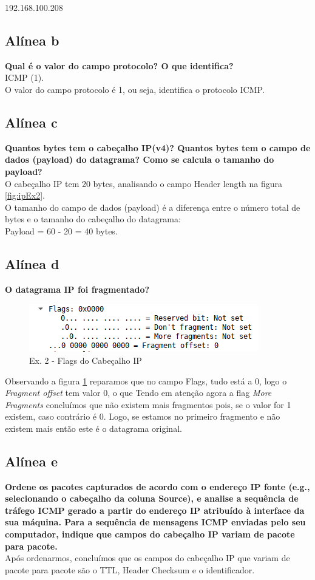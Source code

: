 \documentclass[a4paper]{report}
\begin{document}
192.168.100.208

\subsection{Alínea b}
\textbf{Qual é o valor do campo protocolo? O que identifica?}\\
ICMP (1).\\
O valor do campo protocolo é 1, ou seja, identifica o protocolo ICMP.

\subsection{Alínea c}
\textbf{Quantos bytes tem o cabeçalho IP(v4)? Quantos bytes tem o
campo de dados (payload) do datagrama? Como se calcula o tamanho 
do payload?}\\
O cabeçalho IP tem 20 bytes, analisando o campo Header length na 
figura \ref{fig:ipEx2}.\\
O tamanho do campo de dados (payload) é a diferença entre o número 
total de bytes e o tamanho do cabeçalho do datagrama:\\
Payload = 60 - 20 = 40 bytes.

\subsection{Alínea d}
\textbf{O datagrama IP foi fragmentado? }

\begin{figure}[H]
    \centering 
    \includegraphics[width=\textwidth]{images/ipEx2Flags.png}
    \caption{Ex. 2 - Flags do Cabeçalho IP}
    \label{fig:ipEx2Flags}
\end{figure}
Observando a figura \ref{fig:ipEx2Flags} reparamos que no 
campo Flags, tudo está a 0, logo o \textit{Fragment offset} tem valor 0, o que
Tendo em atenção agora a flag \textit{More Fragments} concluímos que não existem
mais fragmentos pois, se o valor for 1 existem, caso contrário é 0. Logo,
se estamos no primeiro fragmento e não existem mais então este é o datagrama
original.

\subsection{Alínea e}
\textbf{Ordene os pacotes capturados de acordo com o endereço IP 
fonte (e.g., selecionando o cabeçalho
da coluna Source), e analise a sequência de tráfego ICMP gerado a partir 
do endereço IP atribuído à interface da sua máquina. Para a sequência 
de mensagens ICMP enviadas pelo seu computador, indique que campos do 
cabeçalho IP variam de pacote para pacote.}\\
Após ordenarmos, concluímos que os campos do cabeçalho IP que variam de 
pacote para pacote são o TTL, Header Checksum e o identificador.
\end{document}
